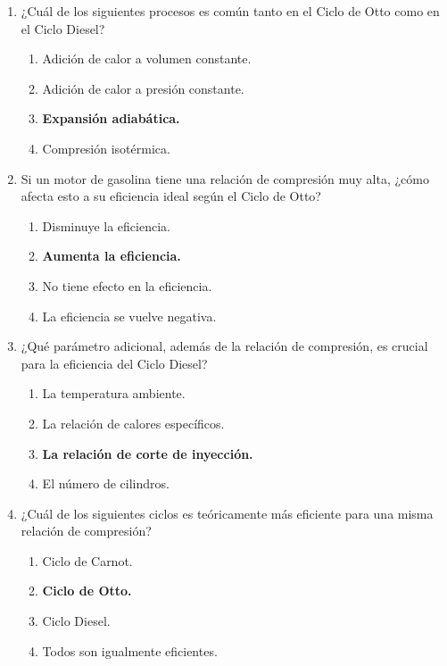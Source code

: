 \documentclass{article}
\begin{document}
\begin{enumerate}[label=\arabic*.]
    \item ¿Cuál de los siguientes procesos es común tanto en el Ciclo de Otto como en el Ciclo Diesel?
    \begin{enumerate}[label=\alph*)]
        \item Adición de calor a volumen constante.
        \item Adición de calor a presión constante.
        \item \textbf{Expansión adiabática.}
        \item Compresión isotérmica.
    \end{enumerate}

    \item Si un motor de gasolina tiene una relación de compresión muy alta, ¿cómo afecta esto a su eficiencia ideal según el Ciclo de Otto?
    \begin{enumerate}[label=\alph*)]
        \item Disminuye la eficiencia.
        \item \textbf{Aumenta la eficiencia.}
        \item No tiene efecto en la eficiencia.
        \item La eficiencia se vuelve negativa.
    \end{enumerate}

    \item ¿Qué parámetro adicional, además de la relación de compresión, es crucial para la eficiencia del Ciclo Diesel?
    \begin{enumerate}[label=\alph*)]
        \item La temperatura ambiente.
        \item La relación de calores específicos.
        \item \textbf{La relación de corte de inyección.}
        \item El número de cilindros.
    \end{enumerate}

    \item ¿Cuál de los siguientes ciclos es teóricamente más eficiente para una misma relación de compresión?
    \begin{enumerate}[label=\alph*)]
        \item Ciclo de Carnot.
        \item \textbf{Ciclo de Otto.}
        \item Ciclo Diesel.
        \item Todos son igualmente eficientes.
    \end{enumerate}


\end{enumerate}
\end{document}
